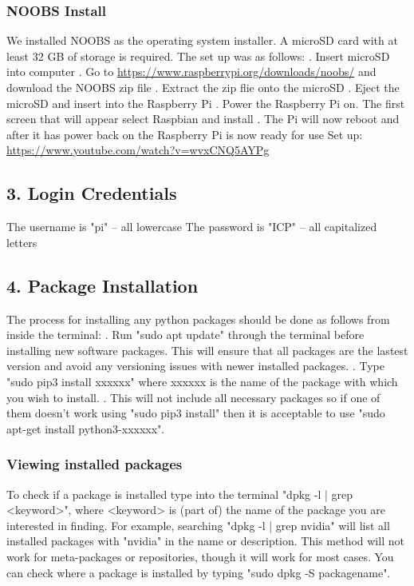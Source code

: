 \documentclass[12pt]{report}
\begin{document}
\subsubsection*{NOOBS Install}
 We installed NOOBS as the operating system installer. A microSD card with at least 32 GB of storage is required. The set up was as follows:
 . Insert microSD into computer . Go to \url{https://www.raspberrypi.org/downloads/noobs/} and download the NOOBS zip file .  Extract the zip flie onto the microSD . Eject the microSD and insert into the Raspberry Pi . Power the Raspberry Pi on. The first screen that will appear select Raspbian and install . The Pi will now reboot and after it has power back on the Raspberry Pi is now ready for use 
\newline\newline Set up: 
\url{https://www.youtube.com/watch?v=wvxCNQ5AYPg}
\subsection*{3. Login Credentials}
\newline The username is "pi" -- all lowercase
\newline The password is "ICP" -- all capitalized letters
\subsection*{4. Package Installation}
\newline The process for installing any python packages should be done as follows from inside the terminal: . Run "sudo apt update" through the terminal before installing new software packages. This will ensure that all packages are the lastest version and avoid any versioning issues with newer installed packages. 
. Type "sudo pip3 install xxxxxx" where xxxxxx is the name of the package with which you wish to install. . This will not include all necessary packages so if one of them doesn't work using "sudo pip3 install" then it is acceptable to use "sudo apt-get install python3-xxxxxx".
\subsubsection*{Viewing installed packages}
To check if a package is installed type into the terminal "dpkg -l | grep <keyword>", where <keyword> is (part of) the name of the package you are interested in finding. For example, searching "dpkg -l | grep nvidia" will list all installed packages with "nvidia" in the name or description. This method will not work for meta-packages or repositories, though it will work for most cases. You can check where a package is installed by typing "sudo dpkg -S packagename".
\end{document}
